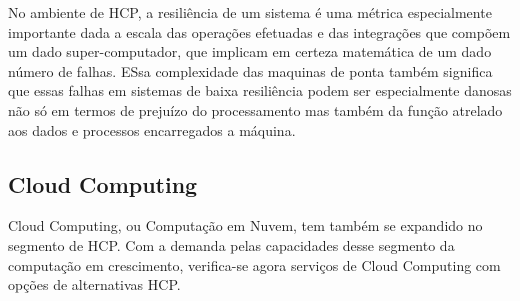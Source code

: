 \documentclass{article}
\begin{document}
No ambiente de HCP, a resiliência de um sistema é uma métrica especialmente importante dada a escala das operações efetuadas e das integrações que compõem um dado super-computador, que implicam em certeza matemática de um dado número de falhas. ESsa complexidade das maquinas de ponta também significa que essas falhas em sistemas de baixa resiliência podem ser especialmente danosas não só em termos de prejuízo do processamento mas também da função atrelado aos dados e processos encarregados a máquina.

\subsection*{Cloud Computing}
Cloud Computing, ou Computação em Nuvem, tem também se expandido no segmento de HCP. Com a demanda pelas capacidades desse segmento da computação em crescimento, verifica-se agora serviços de Cloud Computing com opções de alternativas HCP.
\end{document}
